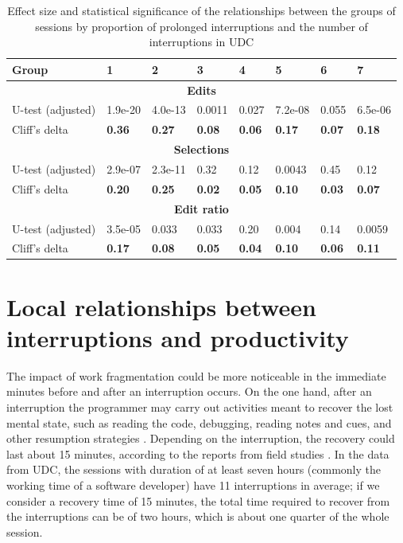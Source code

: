 \begin{table}[ht!]
	\small

	\caption{Effect size and statistical significance of the relationships between the groups of sessions by proportion of prolonged interruptions and the number of interruptions in UDC}
	\label{tbl:effect_size_dur_udc}
	\centering
	\begin{tabular}{l | p{1cm} | p{1cm} | p{1cm} | p{1cm} | p{1cm} | p{1cm} | p{1cm}} 
		\hline
		Group & 1 & 2 & 3 & 4 & 5 & 6 & 7  \\  
		\hline
		\hline
		\multicolumn{8}{c}{\textbf{Edits}} \\
		\hline
		U-test (adjusted) & 1.9e-20 & 4.0e-13 & 0.0011 & 0.027 & 7.2e-08 & 0.055 & 6.5e-06\\
		\hline
		Cliff's delta & \textbf{0.36} & \textbf{0.27} & \textbf{0.08} & \textbf{0.06} & \textbf{0.17} & \textbf{0.07} & \textbf{0.18} \\
		\hline
		
		\multicolumn{8}{c}{\textbf{Selections}} \\
		\hline 
		U-test (adjusted) & 2.9e-07 & 2.3e-11 & 0.32 & 0.12 & 0.0043 & 0.45 & 0.12 \\
		\hline
		Cliff's delta & \textbf{0.20} & \textbf{0.25} & \textbf{0.02} & \textbf{0.05} & \textbf{0.10} & \textbf{0.03} & \textbf{0.07} \\  
		\hline
		
		\multicolumn{8}{c}{\textbf{Edit ratio}} \\
		\hline 
		U-test (adjusted) & 3.5e-05 & 0.033 & 0.033 & 0.20 & 0.004 & 0.14 & 0.0059 \\
		\hline 
		Cliff's delta & \textbf{0.17} & \textbf{0.08} & \textbf{0.05} & \textbf{0.04} & \textbf{0.10} & \textbf{0.06} & \textbf{0.11}  \\
		\hline
		
	\end{tabular}
\end{table}

\section{Local relationships between interruptions and productivity}
The impact of work fragmentation could be more noticeable in the immediate minutes before and after an interruption occurs. On the one hand, after an interruption the programmer may carry out activities meant to recover the lost mental state, such as reading the code, debugging, reading notes and cues, and other resumption strategies \cite{PR11}. Depending on the interruption, the recovery could last about 15 minutes, according to the reports from field studies \cite{IH07, SBV98}. In the data from UDC, the sessions with duration of at least seven hours (commonly the working time of a software developer) have 11 interruptions in average; if we consider a recovery time of 15 minutes, the total time required to recover from the interruptions can be of two hours, which is about one quarter of the whole session.


